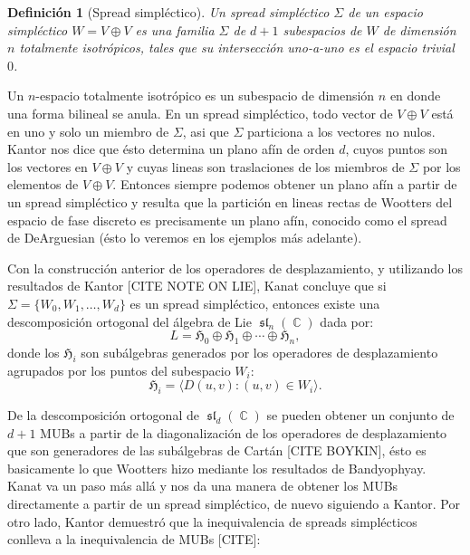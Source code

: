 \documentclass[a4paper]{report}
\DeclareMathOperator{\C}{\mathbb{C}}
\DeclareMathOperator{\Sl}{\mathfrak{sl}}
\newtheorem{definition}{Definición}
\begin{document}
  \begin{definition}[Spread simpléctico]
    Un spread simpléctico $\Sigma$ de un espacio simpléctico
    $W = V \oplus V$ es una familia $\Sigma$ de $d+1$
    subespacios de $W$ de dimensión $n$ totalmente
    isotrópicos, tales que su intersección uno-a-uno es el
    espacio trivial $0$. 
  \end{definition}
  Un $n$-espacio totalmente isotrópico es un subespacio de
  dimensión $n$ en donde una forma bilineal se anula. En un
  spread simpléctico, todo vector de $V \oplus V$ está en
  uno y solo un miembro de $\Sigma$, asi que $\Sigma$
  particiona a los vectores no nulos. Kantor nos dice que
  ésto determina un plano afín de orden $d$, cuyos puntos
  son los vectores en $V \oplus V$ y cuyas lineas son
  traslaciones de los miembros de $\Sigma$ por los elementos
  de $V \oplus V$. Entonces siempre podemos obtener un plano
  afín a partir de un spread simpléctico y resulta que la
  partición en lineas rectas de Wootters del espacio de fase
  discreto es precisamente un plano afín, conocido como el
  spread de DeArguesian (ésto lo veremos en los ejemplos más
  adelante).

  Con la construcción anterior de los operadores de
  desplazamiento, y utilizando los resultados de Kantor
  [CITE NOTE ON LIE], Kanat concluye que si $\Sigma = \{W_0,
  W_1, \ldots, W_d\}$ es un spread simpléctico, entonces
  existe una descomposición ortogonal del álgebra de Lie
  $\Sl_n(\C)$ dada por:
  \begin{equation}
    L
    = \mathfrak{H}_0 \oplus \mathfrak{H}_1 \oplus \cdots
    \oplus \mathfrak{H}_n,
  \end{equation}
  donde los $\mathfrak{H}_i$ son subálgebras generados por
  los operadores de desplazamiento agrupados por los
  puntos del subespacio $W_i$:
  \begin{equation}
    \mathfrak{H}_i = \langle D(u,v) : (u,v) \in W_i \rangle.
  \end{equation}

  De la descomposición ortogonal de $\Sl_d(\C)$ se pueden
  obtener un conjunto de $d+1$ MUBs a partir de la
  diagonalización de los operadores de desplazamiento que
  son generadores de las subálgebras de Cartán [CITE
  BOYKIN], ésto es basicamente lo que Wootters hizo mediante
  los resultados de Bandyophyay. Kanat va un paso más allá y
  nos da una manera de obtener los MUBs directamente a
  partir de un spread simpléctico, de nuevo siguiendo a
  Kantor. Por otro lado, Kantor demuestró que la
  inequivalencia de spreads simplécticos conlleva a la
  inequivalencia de MUBs [CITE]:
\end{document}
